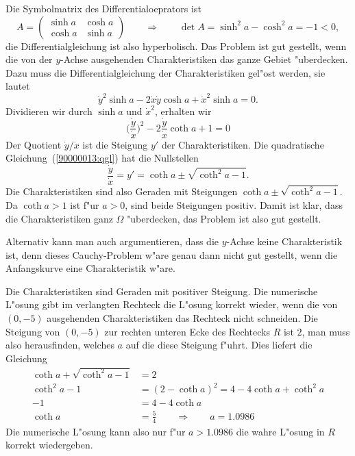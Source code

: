 \begin{loesung}
\begin{teilaufgaben}
\item
Die Symbolmatrix des Differentialoeprators ist
\[
A=\begin{pmatrix}\sinh a&\cosh a \\ \cosh a&\sinh a\end{pmatrix}
\qquad\Rightarrow\qquad
\det A=\sinh^2 a - \cosh^2 a = -1<0,
\]
die Differentialgleichung ist also hyperbolisch.
Das Problem ist gut gestellt, wenn die von der $y$-Achse ausgehenden
Charakteristiken das ganze Gebiet "uberdecken. 
Dazu muss die Differentialgleichung der Charakteristiken gel"ost werden,
sie lautet
\[
\dot y^2
\sinh a
-2
\dot x\dot y
\cosh a
+
\dot x^2
\sinh a
=0.
\]
Dividieren wir durch $\sinh a $ und $\dot x^2$, erhalten wir
\begin{equation}
\biggl(\frac{\dot y}{\dot x}\biggr)^2
-2\frac{\dot y}{\dot x} \coth a + 1=0
\label{90000013:qgl}
\end{equation}
Der Quotient $\dot y/\dot x$ ist die Steigung $y'$ der Charakteristiken.
Die quadratische Gleichung~(\ref{90000013:qgl}) hat die Nullstellen
\[
\frac{\dot y}{\dot x}=y'=
\coth a\pm\sqrt{\coth^2 a-1}
.
\]
Die Charakteristiken sind also Geraden mit Steigungen
$\coth a\pm\sqrt{\coth^2a-1}$.
Da $\coth a>1$ ist f"ur $a>0$, sind beide Steigungen positiv.
Damit ist klar, dass die Charakteristiken ganz $\Omega$ "uberdecken, das
Problem ist also gut gestellt.

Alternativ kann man auch argumentieren, dass die $y$-Achse keine 
Charakteristik ist, denn dieses Cauchy-Problem w"are genau dann
nicht gut gestellt, wenn die Anfangskurve eine Charakteristik w"are.
\item
Die Charakteristiken sind Geraden mit positiver Steigung.
Die numerische L"osung gibt im verlangten Rechteck die L"osung
korrekt wieder, wenn die von $(0,-5)$ ausgehenden Charakteristiken
das Rechteck nicht schneiden.
Die Steigung von $(0,-5)$ zur rechten unteren Ecke des Rechtecks $R$
ist $2$, 
man muss also herausfinden, welches $a$ auf die diese Steigung f"uhrt.
Dies liefert die Gleichung
\begin{align*}
\coth a + \sqrt{\coth^2 a-1}&=2
\\
\coth^2 a-1&=(2-\coth a)^2=4-4\coth a +\coth^2 a
\\
-1 &=4-4\coth a
\\
\coth a&=\frac54
\qquad\Rightarrow\qquad
a=1.0986
\end{align*}
Die numerische L"osung kann also nur f"ur $a>1.0986$ die wahre L"osung in
$R$ korrekt wiedergeben.
\qedhere
\end{teilaufgaben}
\end{loesung}
